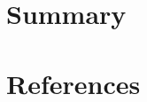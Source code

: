 \section{Summary} \label{s:introduction:summary}
	\begin{comment}
		Brief summary of the document.
	\end{comment}
	
\section{References} \label{s:introduction:references}
	\begin{comment}
		$<$List any other documents or Web addresses to which this SRS refers. These may 
		include user interface style guides, contracts, standards, system requirements 
		specifications, use case documents, or a vision and scope document. Provide 
		enough information so that the reader could access a copy of each reference, 
		including title, author, version number, date, and source or location.$>$
	\end{comment}
	
